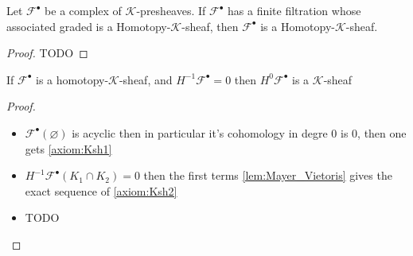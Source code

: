 \begin{lemma}\label{lem:homotpy_k_sheaves_stable_by_extension}
    Let $\mathcal{F}^{\bullet}$ be a complex of $\mathcal{K}$-presheaves. If $\mathcal{F}^{\bullet}$ has a finite filtration whose associated graded is a Homotopy-$\mathcal{K}$-sheaf, then $\mathcal{F}^{\bullet}$ is a Homotopy-$\mathcal{K}$-sheaf.
\end{lemma}

\begin{proof}
    TODO
\end{proof}

\begin{lemma}\label{lem:first_non_zero_homology_of_homotopy_k_sheaf_is_k_sheaf}
    If $\mathcal{F}^{\bullet}$ is a homotopy-$\mathcal{K}$-sheaf, and $H^{-1}\mathcal{F}^{\bullet}=0$ then $H^{0}\mathcal{F}^{\bullet}$ is a $\mathcal{K}$-sheaf
\end{lemma}

\begin{proof}
    \begin{itemize}
        \item $\mathcal{F}^{\bullet}(\varnothing)$ is acyclic then in particular it's cohomology in degre $0$ is $0$, then one gets \eqref{axiom:Ksh1}
        \item $H^{-1}\mathcal{F}^{\bullet}(K_1\cap K_2)=0$ then the first terms \ref{lem:Mayer_Vietoris} gives the exact sequence of \eqref{axiom:Ksh2}
        \item TODO
    \end{itemize}
\end{proof}



